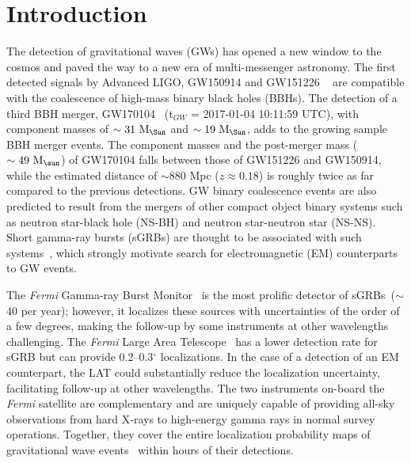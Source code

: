 \documentclass{aastex61}
\begin{document}
\section{Introduction} \label{sec:intro}
The detection of gravitational waves (GWs) has opened a new window to the cosmos and paved the way to a new era of multi-messenger astronomy. The first detected signals by Advanced LIGO, GW150914 and GW151226 ~\citep{Abbott2016gw150914, Abbott2016gw151226} are compatible with the coalescence of high-mass binary black holes (BBHs). The detection of a third BBH merger, GW170104~\citep{GW170104} (t$_{GW}$ = 2017-01-04 10:11:59 UTC), with component masses of $\sim 31 \ \rm M_\Sun$ and $\sim 19 \ \rm M_\Sun$, adds to the growing sample BBH merger events.  The component masses and the post-merger mass ($\sim 49 \ \rm M_\sun$) of GW170104 falls between those of GW151226 and GW150914, while the estimated distance of $\sim 880$ Mpc ($z\approx 0.18$) is roughly twice as far compared to the previous detections.  GW binary coalescence events are also predicted to result from the mergers of other compact object binary systems such as neutron star-black hole (NS-BH)
and neutron star-neutron star (NS-NS). Short gamma-ray bursts (sGRBs) are thought to be associated with such systems~\citep{Eichler89,Narayan92,Lee07}, which strongly motivate search for electromagnetic (EM) counterparts to GW events.


The {\it Fermi} Gamma-ray Burst Monitor~\citep[GBM,][]{Meegan09} is the most prolific detector of sGRBs~\citep{Bhat16}($\sim$40 per year); however, it localizes these sources with uncertainties of the order of a few degrees, making the follow-up by some instruments at other wavelengths challenging. The {\it Fermi} Large Area Telescope~\citep[LAT,][]{Atwood09} has a lower detection rate for sGRB  but can provide 0.2--0.3$^{\circ}$ localizations. In the case of a detection of an EM counterpart, the LAT could substantially reduce the localization uncertainty, facilitating follow-up at other wavelengths. The two instruments on-board the {\it Fermi} satellite are complementary and are uniquely capable of providing  all-sky  observations  from  hard X-rays to  high-energy gamma rays in normal survey  operations. Together, they cover the  entire  localization probability maps of gravitational wave events~\citep{Ackermann16,Racusin17} within hours of their detections.
\end{document}
